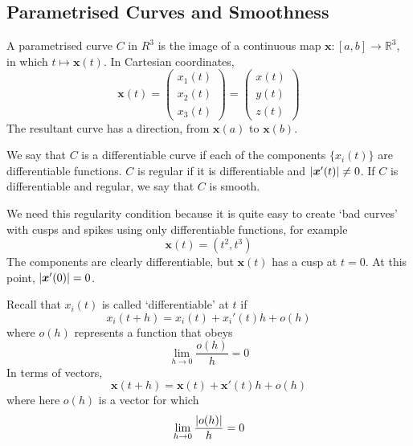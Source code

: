 \documentclass{article}
\begin{document}
\subsection{Parametrised Curves and Smoothness}
A parametrised curve $C$ in $R^3$ is the image of a continuous map $\bm x \colon [a, b] \to \mathbb R^3$, in which $t \mapsto \bm x(t)$. In Cartesian coordinates,
\[ \bm x(t) = \begin{pmatrix}
        x_1(t) \\ x_2(t) \\ x_3(t)
    \end{pmatrix} = \begin{pmatrix}
        x(t) \\ y(t) \\ z(t)
    \end{pmatrix} \]
The resultant curve has a direction, from $\bm x(a)$ to $\bm x(b)$.
\begin{definition}
    We say that $C$ is a differentiable curve if each of the components $\{x_i(t)\}$ are differentiable functions. $C$ is regular if it is differentiable and $\abs{\bm x'(t)} \neq 0$. If $C$ is differentiable and regular, we say that $C$ is smooth.
\end{definition}
\begin{note}
    We need this regularity condition because it is quite easy to create `bad curves' with cusps and spikes using only differentiable functions, for example
    \[ \bm x(t) = (t^2, t^3) \]
    The components are clearly differentiable, but $\bm x(t)$ has a cusp at $t = 0$. At this point, $\abs{\bm x'(0)} = 0$.
\end{note}
\begin{definition}
    Recall that $x_i(t)$ is called `differentiable' at $t$ if
    \[ x_i(t+h) = x_i(t) + x_i'(t)h + o(h) \]
    where $o(h)$ represents a function that obeys
    \[ \lim_{h \to 0} \frac{o(h)}{h} = 0 \]
    In terms of vectors,
    \[ \bm x(t+h) = \bm x(t) + \bm x'(t)h + o(h) \]
    where here $o(h)$ is a vector for which
    \[ \lim_{h \to 0} \frac{\abs{o(h)}}{h} = 0 \]
\end{definition}
\end{document}
